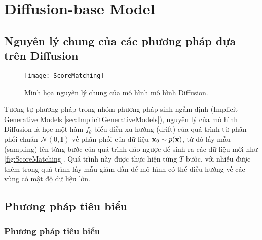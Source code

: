 \section{Diffusion-base Model}
\label{sec:diffusionbase}

\subsection{Nguyên lý chung của các phương pháp dựa trên Diffusion}

\begin{figure}[H]
	\centering
	\texttt{[image: ScoreMatching]}
	\caption{Minh họa nguyên lý chung của mô hình mô hình Diffusion.}
	\label{fig:ScoreMatching}
\end{figure}

Tương tự phương pháp trong nhóm phương pháp sinh ngầm định (Implicit Generative Models \autoref{sec:ImplicitGenerativeModels}), nguyên lý của mô hình Diffusion là học một hàm $f_{\theta}$ biểu diễn xu hướng (drift) của quá trình từ phân phối chuẩn $\mathcal{N}(0, \mathbf{I})$ về phân phối của dữ liệu $\mathbf{x}_{0} \sim p(\mathbf{x})$, từ đó lấy mẫu (sampling) lên từng bước của quá trình đảo ngược để sinh ra các dữ liệu mới như \autoref{fig:ScoreMatching}.
Quá trình này được thực hiện từng $T$ bước, với nhiễu được thêm trong quá trình lấy mẫu giảm dần để mô hình có thể điều hướng về các vùng có mật độ dữ liệu lớn.

\subsection{Phương pháp tiêu biểu}
\label{subsec:TypicalMethod}

\subsubsection{Phương pháp tiêu biểu}

